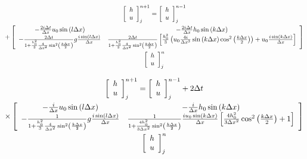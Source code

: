 \documentclass[12pt]{article}
\begin{document}
\begin{multline}
\left[\begin{array}{c}
h \\
u
\end{array} \right]^{n+1}_j = \left[\begin{array}{c}
h \\
u
\end{array} \right]^{n-1}_j  \\+\left[\begin{array}{c c}
-\frac{2i\Delta t}{\Delta x}u_0 \sin\left(l \Delta x\right) & -\frac{2i\Delta t}{\Delta x}h_0\sin\left(k \Delta x\right) \\
-\frac{2 \Delta t}{1 +\frac{h_0^2}{3}\frac{4}{\Delta x^2}\sin^2\left(\frac{k\Delta x}{2}\right) }g\frac{i \sin\left(l \Delta x\right)}{\Delta x} & \frac{2 \Delta t}{1 +\frac{h_0^2}{3}\frac{4}{\Delta x^2}\sin^2\left(\frac{k\Delta x}{2}\right) } \left[\frac{h_0^2}{3}\left(u_0 \frac{4i}{\Delta x^3}\sin\left(k\Delta x\right) \cos^2\left(\frac{k\Delta x}{2}\right)  \right) + u_0\frac{i \sin\left(k \Delta x\right)}{\Delta x} \right]
\end{array} \right] \\  \left[\begin{array}{c}
h \\
u
\end{array} \right]^{n}_j 
\end{multline}

\begin{multline}
\left[\begin{array}{c}
h \\
u
\end{array} \right]^{n+1}_j = \left[\begin{array}{c}
h \\
u
\end{array} \right]^{n-1}_j  + 2 \Delta t \\\times\left[\begin{array}{c c}
-\frac{i}{\Delta x}u_0 \sin\left(l \Delta x\right) & -\frac{i}{\Delta x}h_0\sin\left(k \Delta x\right) \\
-\frac{1}{1 +\frac{h_0^2}{3}\frac{4}{\Delta x^2}\sin^2\left(\frac{k\Delta x}{2}\right) }g\frac{i \sin\left(l \Delta x\right)}{\Delta x} & \frac{1}{1 +\frac{4h^2_0}{3\Delta x^2}\sin^2\left(\frac{k\Delta x}{2}\right) }  \frac{i u_0 \sin\left(k \Delta x\right)}{\Delta x} \left[\frac{4h_0^2}{3\Delta x^2} \cos^2\left(\frac{k\Delta x}{2}\right) + 1 \right]
\end{array} \right] \\  \left[\begin{array}{c}
h \\
u
\end{array} \right]^{n}_j 
\end{multline}
\end{document}
